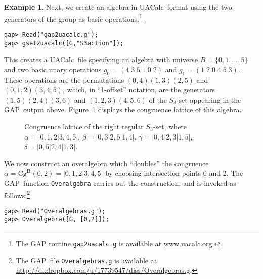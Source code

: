 \documentclass[cm,dissertation]{uhthesis}
\theoremstyle{plain}
\theoremstyle{definition}
\newtheorem{example}[theorem]{Example}
\theoremstyle{remark}
\numberwithin{theorem}{section}
\numberwithin{claim}{chapter}
\numberwithin{equation}{section}
\numberwithin{conjecture}{chapter}
\newcommand{\<}{\ensuremath{\langle}}
\renewcommand{\>}{\ensuremath{\rangle}}
\newcommand{\Cg}{\ensuremath{\mathrm{Cg}}}
\newcommand{\GAP}{\textsf{GAP}}
\newcommand{\uacalc}{\textsf{UACalc}}
\newcommand{\0}{\ensuremath{\mathbf{0}}}
\newcommand{\1}{\ensuremath{\mathbf{1}}}
\newcommand{\2}{\ensuremath{\mathbf{2}}}
\newcommand{\3}{\ensuremath{\mathbf{3}}}
\newcommand{\4}{\ensuremath{\mathbf{4}}}
\newcommand{\5}{\ensuremath{\mathbf{5}}}
\newcommand{\bB}{\ensuremath{\mathbf{B}}}
\begin{document}
\begin{example}
  \noindent Next, we create an algebra
  in \uacalc\ format using the two generators of the
  group as basic operations.\footnote{The GAP
  routine {\tt gap2uacalc.g} is available at \url{www.uacalc.org}.}
  {\footnotesize
\begin{verbatim}
gap> Read("gap2uacalc.g");
gap> gset2uacalc([G,"S3action"]);
\end{verbatim}
}
  \noindent This creates a \uacalc\ file %
  specifying an algebra with universe $B = \{0, 1, \dots, 5\}$ and two
  basic unary operations $g_0 = (4\; 3\;  5\;  1\;  0\;  2)$ and $g_1 = (1\;  2 \; 0\;  4\;  5\;  3)$.
  These operations are the permutations $(0,4)(1,3)(2,5)$ and $(0,1,2)(3,4,5)$, which, in 
  ``1-offset'' notation, are the generators $(1,5)(2,4)(3,6)$ and $(1,2,3)(4,5,6)$
  of the $S_3$-set appearing in the \GAP\ output above.
  Figure~\ref{fig:ConS3} displays the congruence lattice of this algebra.

  \begin{figure}[h!]
    \centering
    \caption{Congruence lattice of the right regular $S_3$-set, where
      $\alpha = | 0, 1, 2 | 3, 4, 5|$,
      $\beta = | 0, 3 | 2, 5 | 1, 4 |$,
      $\gamma = | 0, 4| 2, 3| 1, 5|$, 
      $\delta = | 0, 5| 2, 4| 1, 3|$.
    }
    \label{fig:ConS3}
  \end{figure}

  We now construct an overalgebra which ``doubles'' the congruence $\alpha =
  \Cg^\bB(0,2) = | 0, 1, 2 | 3, 4, 5|$ by choosing intersection points 0 and 2.
  The \GAP\ function {\tt Overalgebra} carries out the construction, and is invoked
  as follows:\footnote{The \GAP\ file 
  {\tt Overalgebras.g} is available at \url{http://dl.dropbox.com/u/17739547/diss/Overalgebras.g}.}

  {\footnotesize
\begin{verbatim}
gap> Read("Overalgebras.g");
gap> Overalgebra([G, [0,2]]);
\end{verbatim}
  }


\end{example}
\end{document}
